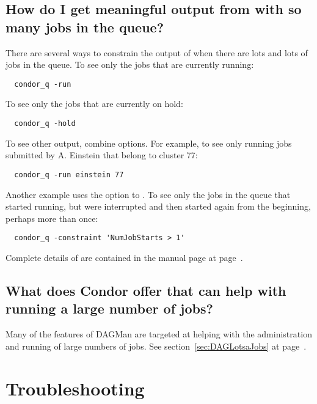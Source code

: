 \subsection*{How do I get meaningful output from  with so many jobs in the queue?}
 
There are several ways to constrain the output of  when there are
lots and lots of jobs in the queue.
To see only the jobs that are currently running:
\begin{verbatim}
  condor_q -run
\end{verbatim}
To see only the jobs that are currently on hold:
\begin{verbatim}
  condor_q -hold
\end{verbatim}
To see other output,  combine options.
For example, to see only running jobs submitted by A. Einstein
that belong to cluster 77:
\begin{verbatim}
  condor_q -run einstein 77
\end{verbatim}
Another example uses the  option to .
To see only the jobs in the queue that started running,
but were interrupted and then started again from the beginning,
perhaps more than once: 
\footnotesize
\begin{verbatim}
  condor_q -constraint 'NumJobStarts > 1'
\end{verbatim}
\normalsize
Complete details of  are contained in the manual page
at page~\pageref{man-condor-q}.

\subsection*{What does Condor offer that can help with running
a large number of jobs?}

Many of the features of DAGMan are targeted at helping with the 
administration and running of large numbers of jobs.
See section~\ref{sec:DAGLotsaJobs} at page~\pageref{sec:DAGLotsaJobs}.
 

\section{Troubleshooting}

